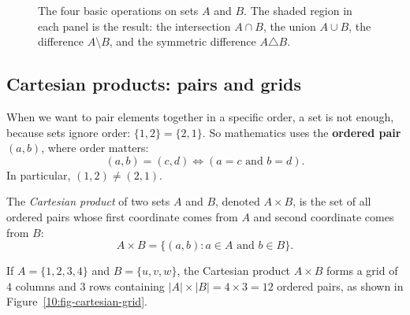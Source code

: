 \begin{figure}[htbp]
\caption{The four basic operations on sets $A$ and $B$. The shaded region in each panel is the result: the intersection $A \cap B$, the union $A \cup B$, the difference $A \setminus B$, and the symmetric difference $A \triangle B$.}\label{10:fig-set-operations}
\end{figure}

\subsection{Cartesian products: pairs and grids}

When we want to pair elements together in a specific order, a set is not enough, because sets ignore order: $\{1, 2\} = \{2, 1\}$. So mathematics uses the \textbf{ordered pair} $(a, b)$, where order matters:
\[
(a, b) = (c, d) \iff (a = c \text{ and } b = d).
\]
In particular, $(1, 2) \neq (2, 1)$.

\begin{definition}
The \emph{Cartesian product} of two sets $A$ and $B$, denoted $A \times B$, is the set of all ordered pairs whose first coordinate comes from $A$ and second coordinate comes from $B$:
\[
A \times B = \{(a, b) : a \in A \text{ and } b \in B\}.
\]
\end{definition}

If $A = \{1, 2, 3, 4\}$ and $B = \{u, v, w\}$, the Cartesian product $A \times B$ forms a grid of $4$ columns and $3$ rows containing $|A| \times |B| = 4 \times 3 = 12$ ordered pairs, as shown in Figure~\ref{10:fig-cartesian-grid}.

